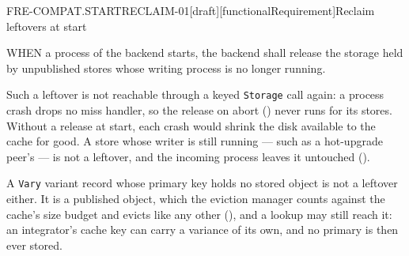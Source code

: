 \begin{requirement}{FRE-COMPAT.STARTRECLAIM-01}[draft][functionalRequirement]{Reclaim leftovers at start}


  WHEN a process of the backend starts, the backend shall release the storage
  held by unpublished stores whose writing process is no longer running.

  Such a leftover is not reachable through a keyed \texttt{Storage} call
  again: a process crash drops no miss handler, so the release on abort
  () never runs for its stores. Without a
  release at start, each crash would shrink the disk available to the cache
  for good. A store whose writer is still running --- such as a hot-upgrade
  peer's --- is not a leftover, and the incoming process leaves it untouched
  ().

  A \texttt{Vary} variant record whose primary key holds no stored object is
  not a leftover either. It is a published object, which the eviction manager
  counts against the cache's size budget and evicts like any other
  (), and a lookup may still reach it: an
  integrator's cache key can carry a variance of its own, and no primary is
  then ever stored.



\end{requirement}

